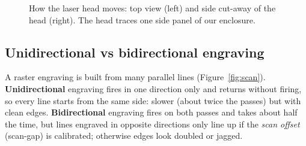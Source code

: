 \documentclass[11pt,a4paper]{report}
\begin{document}
\begin{figure}[H]
\caption{How the laser head moves: top view (left) and side cut-away of the head (right). The head traces one side panel of our enclosure.}
\label{fig:lasermotion}
\end{figure}

\subsection{Unidirectional vs bidirectional engraving}
A raster engraving is built from many parallel lines (Figure~\ref{fig:scan}).
\textbf{Unidirectional} engraving fires in one direction only and returns without firing, so every line starts from the same side: slower (about twice the passes) but with clean edges.
\textbf{Bidirectional} engraving fires on both passes and takes about half the time, but lines engraved in opposite directions only line up if the \emph{scan offset} (scan-gap) is calibrated; otherwise edges look doubled or jagged.
\end{document}
